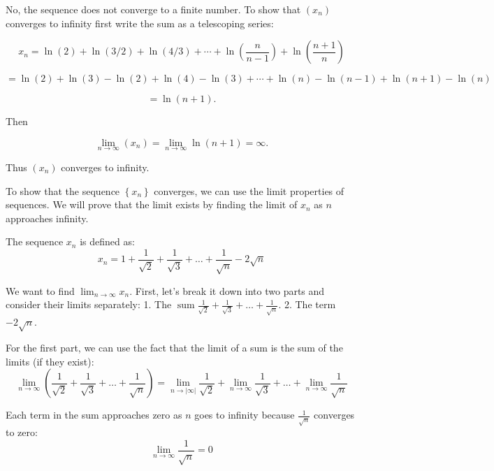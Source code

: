 \documentclass{report}
\begin{document}
\begin{myproof}

  No, the sequence does not converge to a finite number. To show that $(x_n)$ converges to infinity first write the sum as a telescoping series:

$$ x_n = \ln(2) + \ln(3/2) + \ln(4/3) + \cdots + \ln\left( \frac{n}{n-1}\right) + \ln\left(\frac{n +1}{n}\right) $$

$$  = \ln(2) + \ln(3) - \ln(2) + \ln(4) - \ln(3) + \cdots + \ln(n) - \ln(n-1) + \ln(n+1) - \ln(n) $$

$$  =  \ln(n+1).$$

Then


$$ \lim_{n \rightarrow   \infty} (x_n)= \lim_{n \rightarrow \infty} \ln(n+1) = \infty.$$

Thus $(x_n)$ converges to infinity.



\end{myproof}

\bigskip
{}

To show that the sequence $\left\{x_n\right\}$ converges, we can use the limit properties of sequences. We will prove that the limit exists by finding the limit of $x_n$ as $n$ approaches infinity.

The sequence $x_n$ is defined as:
$$
x_n=1+\frac{1}{\sqrt{2}}+\frac{1}{\sqrt{3}}+\ldots+\frac{1}{\sqrt{n}}-2 \sqrt{n}
$$

We want to find $\lim _{n \rightarrow \infty} x_n$. First, let's break it down into two parts and consider their limits separately:
1. The $\operatorname{sum} \frac{1}{\sqrt{2}}+\frac{1}{\sqrt{3}}+\ldots+\frac{1}{\sqrt{n}}$.
2. The term $-2 \sqrt{n}$.

For the first part, we can use the fact that the limit of a sum is the sum of the limits (if they exist):
$$
\lim _{n \rightarrow \infty}\left(\frac{1}{\sqrt{2}}+\frac{1}{\sqrt{3}}+\ldots+\frac{1}{\sqrt{n}}\right)=\lim _{n \rightarrow|\infty|} \frac{1}{\sqrt{2}}+\lim _{n \rightarrow \infty} \frac{1}{\sqrt{3}}+\ldots+\lim _{n \rightarrow \infty} \frac{1}{\sqrt{n}}
$$

Each term in the sum approaches zero as $n$ goes to infinity because $\frac{1}{\sqrt{n}}$ converges to zero:
$$
\lim _{n \rightarrow \infty} \frac{1}{\sqrt{n}}=0
$$
\end{document}
